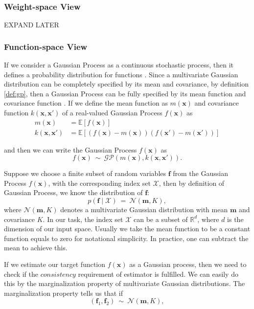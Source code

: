 \documentclass[11pt,a4paper]{article}
\theoremstyle{definition}
\newcommand{\GP}{\mathcal{GP}}
\newcommand{\EE}{\mathbb{E}}
\numberwithin{equation}{section}
\let\vec\mathbf
\begin{document}
\subsubsection{Weight-space View}
EXPAND LATER
\subsubsection{Function-space View}
If we consider a Gaussian Process as a continuous stochastic process, then it defines a probability distribution for functions \cite[Papoulis]{Papoulis}. Since a multivariate Gaussian distribution can be completely specified by its mean and covariance, by definition \ref{def:gp}, then a Gaussian Process can be fully specified by its mean function and covariance function \cite[Rasmussen and Williams]{RandW}. If we define the mean function as $m(\vec{x})$ and covariance function $k(\vec{x},\vec{x'})$ of a real-valued Gaussian Process $f(\vec x)$ as
\begin{equation} \label{}
\begin{split}
m(\vec{x}) & = \EE \left[ f(\vec x)\right] \\
k(\vec{x},\vec{x'}) & = \EE \left[ \left( f(\vec x)-m(\vec{x})\right)\left( f(\vec x')-m(\vec{x'})\right)\right] 
\end{split}
\end{equation}

and then we can write the Gaussian Process $f(\vec x)$ as
\begin{equation} \label{}
f(\vec x) \  \sim \ \GP\left(m(\vec{x}),k(\vec{x},\vec{x'})  \right).
\end{equation}

Suppose we choose a finite subset of random variables $\vec f$ from the Gaussian Process $f(\vec x)$, with the corresponding index set $\mathcal X$, then by definition of Gaussian Process, we know the distribution of $\vec f$:
\begin{equation} \label{}
p\left(\vec f \mid \mathcal X\right)\ =\ \mathcal N \left(\vec m , K \right),
\end{equation}
where $\mathcal N \left(\vec m , K \right)$ denotes a multivariate Gaussian distribution with mean $\vec m$ and covariance $K$. 
In our task, the index set $\mathcal X$ can be a subset of $\mathbb R ^d$, where $d$ is the dimension of our input space. Usually we take the mean function to be a constant function equals to zero for notational simplicity. In practice, one can subtract the mean to achieve this. 

If we estimate our target function $f(\vec x)$ as a Gaussian process, then we need to check if the $consistency$ requirement of estimator is fulfilled. We can easily do this by the marginalization property of multivariate Gaussian distributions. The marginalization property tells us that if 
\begin{equation*} \label{}
\left(\vec f_1, \vec f_2\right)\ \sim \ \mathcal N \left(\vec m , K \right),
\end{equation*}
\end{document}
